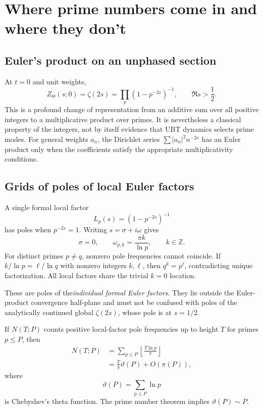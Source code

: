 \section{Where prime numbers come in and where they don't}

\subsection{Euler's product on an unphased section}

At $t=0$ and unit weights,
\begin{equation}
 Z_\Theta(s;0)=\zeta(2s)
 =\prod_{p}\left(1-p^{-2s}\right)^{-1},
 \qquad \Re s>\frac12.
 \label{eq:zeta-euler-product}
\end{equation}
This is a profound change of representation from an additive sum over all positive
integers to a multiplicative product over primes.  It is nevertheless a classical
property of the integers, not by itself evidence that UBT dynamics selects prime modes.
For general weights $a_n$, the Dirichlet series
$\sum |a_n|^2n^{-2s}$ has an Euler product only when the coefficients satisfy the
appropriate multiplicativity conditions.

\subsection{Grids of poles of local Euler factors}

A single formal local factor
\begin{equation}
 L_p(s)=\left(1-p^{-2s}\right)^{-1}
\end{equation}
has poles when $p^{-2s}=1$.  Writing $s=\sigma+i\omega$ gives
\begin{equation}
 \sigma=0,
 \qquad
 \omega_{p,k}=\frac{\pi k}{\ln p},
 \qquad k\in\mathbb Z.
 \label{eq:local-prime-poles}
\end{equation}
For distinct primes $p\neq q$, nonzero pole frequencies cannot coincide.  If
$k/\ln p=\ell/\ln q$ with nonzero integers $k,\ell$, then
$q^k=p^\ell$, contradicting unique factorization.  All local factors share the trivial
$k=0$ location.

These are poles of the\emph{individual formal Euler factors}.  They lie outside the
Euler-product convergence half-plane and must not be confused with poles of the
analytically continued global $\zeta(2s)$, whose pole is at $s=1/2$.

If $N(T;P)$ counts positive local-factor pole frequencies up to height $T$ for primes
$p\le P$, then
\begin{align}
 N(T;P)
 &=\sum_{p\le P}\left\lfloor\frac{T\ln p}{\pi}\right\rfloor\\
 &=\frac{T}{\pi}\vartheta(P)+O(\pi(P)),
 \label{eq:local-pole-count}
\end{align}
where
\begin{equation}
 \vartheta(P)=\sum_{p\le P}\ln p
\end{equation}
is Chebyshev's theta function.  The prime number theorem implies
$\vartheta(P)\sim P$.

